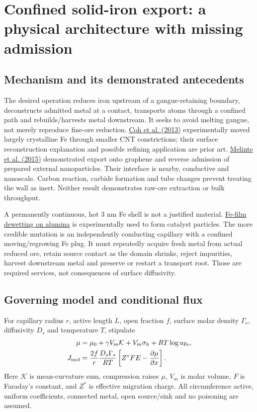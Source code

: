 \documentclass[11pt]{article}
\begin{document}
\section{Confined solid-iron export: a physical architecture with missing admission}

\subsection{Mechanism and its demonstrated antecedents}

The desired operation reduces iron upstream of a gangue-retaining boundary,
deconstructs admitted metal at a contact, transports atoms through a confined
path and rebuilds/harvests metal downstream. It seeks to avoid melting gangue,
not merely reproduce fine-ore reduction.
\href{https://arxiv.org/html/1302.5709v2}{Coh et al. (2013)} experimentally moved
largely crystalline Fe through smaller CNT constrictions; their surface
reconstruction explanation and possible refining application are prior art.
\href{https://www.nature.com/articles/ncomms9071}{Melinte et al. (2015)}
demonstrated export onto graphene and reverse admission of prepared external
nanoparticles. Their interface is nearby, conductive and nanoscale. Carbon
reaction, carbide formation and tube changes prevent treating the wall as
inert. Neither result demonstrates raw-ore extraction or bulk throughput.

A permanently continuous, hot 3 nm Fe shell is not a justified material.
\href{https://www.nature.com/articles/srep46725}{Fe-film dewetting on alumina}
is experimentally used to form catalyst particles. The more credible mutation
is an independently conducting capillary with a confined moving/regrowing Fe
plug. It must repeatedly acquire fresh metal from actual reduced ore, retain
source contact as the domain shrinks, reject impurities, harvest downstream
metal and preserve or restart a transport root. Those are required services,
not consequences of surface diffusivity.

\subsection{Governing model and conditional flux}

For capillary radius $r$, active length $L$, open fraction $f$, surface molar
density $\Gamma_s$, diffusivity $D_s$ and temperature $T$, stipulate
\begin{align}
 \mu&=\mu_0+\gamma V_m\mathcal K+V_m\sigma_h+RT\log a_{\rm Fe},\\
 J_{\rm mol}&=\frac{2f}{r}\frac{D_s\Gamma_s}{RT}
          \left[Z^*F E-\frac{\partial\mu}{\partial x}\right].\label{eq:ironflux}
\end{align}
Here $\mathcal K$ is mean-curvature sum, compression raises $\mu$, $V_m$ is
molar volume, $F$ is Faraday's constant, and $Z^*$ is effective migration
charge. All circumference active, uniform coefficients, connected metal,
open source/sink and no poisoning are assumed.
\end{document}
